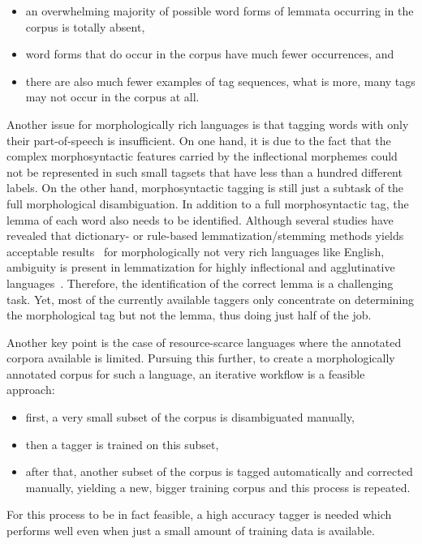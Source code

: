 \begin{itemize}
  \item an overwhelming majority of possible word forms of lemmata occurring in the corpus is totally absent,
  \item word forms that do occur in the corpus have much fewer occurrences, and
  \item there are also much fewer examples of tag sequences, what is more, many tags may not occur in the corpus at all.
\end{itemize}
Another issue for morphologically rich languages is that tagging words with only their part-of-speech is insufficient.
On one hand, it is due to the fact that the complex morphosyntactic features carried by the inflectional morphemes could not be represented in such small tagsets that have less than a hundred different labels.
On the other hand, morphosyntactic tagging is still just a subtask of the full morphological disambiguation.
In addition to a full morphosyntactic tag, the lemma of each word also needs to be identified.
Although several studies have revealed that dictionary- or rule-based lemmatization/stemming methods yields acceptable results~\cite{} for morphologically not very rich languages like English, ambiguity is present in lemmatization for highly inflectional and agglutinative languages~\cite{Hajic,Szlovénok,Morfette}.
Therefore, the identification of the correct lemma is a challenging task.
Yet, most of the currently available taggers only concentrate on determining the morphological tag but not the lemma, thus doing just half of the job.

Another key point is the case of resource-scarce languages where the annotated corpora available is limited.
Pursuing this further, to create a morphologically annotated corpus for such a language, an iterative workflow is a feasible approach:

\begin{itemize}
  \item first, a very small subset of the corpus is disambiguated manually,
  \item then a tagger is trained on this subset,
  \item after that, another subset of the corpus is tagged automatically and corrected manually, yielding a new, bigger training corpus and this process is repeated. 
\end{itemize}
For this process to be in fact feasible, a high accuracy tagger is needed which performs well even when just a small amount of training data is available. 

